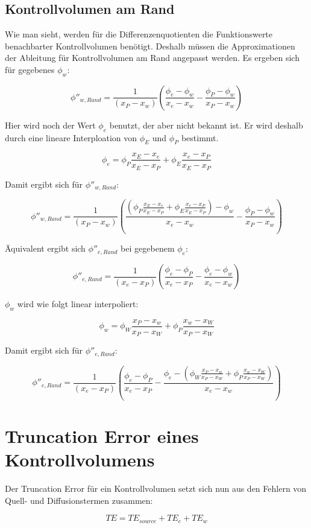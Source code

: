 \documentclass[10pt, ngerman,colorback,accentcolor=tud2d]{tudreport}
\begin{document}
\subsection{Kontrollvolumen am Rand}

Wie man sieht, werden für die Differenzenquotienten die Funktionswerte benachbarter
Kontrollvolumen benötigt. Deshalb müssen die Approximationen der Ableitung für
Kontrollvolumen am Rand angepasst werden. Es ergeben sich für gegebenes $\phi_w$:

\begin{equation*}
  \phi''_{w, Rand} = \frac{1}{(x_P-x_w)}\left({
\frac{\phi_{e}-\phi_w}{x_{e}-x_w}-\frac{\phi_P-\phi_w}{x_P-x_w}}\right)
\end{equation*}

Hier wird noch der Wert $\phi_e$ benutzt, der aber nicht bekannt ist. Er wird deshalb
durch eine lineare Interploation von $\phi_E$ und $\phi_P$ bestimmt.

\begin{equation}
  \phi_e = \phi_P \frac{x_E-x_e}{x_E-x_P} + \phi_E \frac{x_e-x_P}{x_E-x_P}
\end{equation}

Damit ergibt sich für $\phi''_{w,Rand}$:

\begin{equation}
  \phi''_{w,Rand}  = \frac{1}{(x_P-x_w)}\left({
\frac{
  \left({\phi_P \frac{x_E-x_e}{x_E-x_P} + \phi_E \frac{x_e-x_P}{x_E-x_P}
}\right)
-\phi_w}{x_{e}-x_w}-\frac{\phi_P-\phi_w}{x_P-x_w}}\right)
\end{equation}

Äquivalent ergibt sich $\phi''_{e, Rand}$ bei gegebenem $\phi_e$:

\begin{equation*}
  \phi''_{e, Rand} = \frac{1}{(x_e-x_P)}\left({
\frac{\phi_{e}-\phi_P}{x_{e}-x_P}-\frac{\phi_e-\phi_w}{x_e-x_w}}\right)
\end{equation*}

$\phi_w$ wird wie folgt linear interpoliert:

\begin{equation*}
  \phi_w = \phi_W \frac{x_P-x_w}{x_P-x_W} + \phi_P \frac{x_w-x_W}{x_P-x_W}
\end{equation*}

Damit ergibt sich für $\phi''_{e,Rand}$:

\begin{equation}
  \phi''_{e,Rand} = \frac{1}{(x_e-x_P)}\left({
\frac{\phi_{e}-\phi_P}{x_{e}-x_P}-\frac{\phi_e-
  \left({
   \phi_W \frac{x_P-x_w}{x_P-x_W} + \phi_P \frac{x_w-x_W}{x_P-x_W}
  }\right)
}{x_e-x_w}}\right)
\end{equation}

\section{Truncation Error eines Kontrollvolumens}
\label{sec:Truncation Error eines Kontrollvolumens}

Der Truncation Error für ein Kontrollvolumen setzt sich nun aus den Fehlern von Quell-
und Diffusionstermen zusammen:

\begin{equation*}
  TE = TE_{source} + TE_e + TE_w
\end{equation*}
\end{document}
